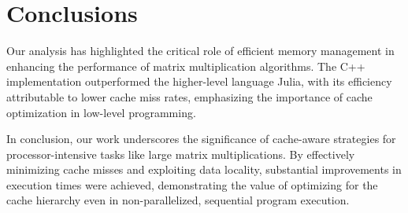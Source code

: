 \documentclass[11pt,a4paper]{article}
\begin{document}
\section{Conclusions}
Our analysis has highlighted the critical role of efficient memory management in enhancing the performance 
of matrix multiplication algorithms. The C++ implementation outperformed the higher-level language Julia, 
with its efficiency attributable to lower cache miss rates, emphasizing the importance of cache optimization 
in low-level programming.

In conclusion, our work underscores the significance of cache-aware strategies for processor-intensive tasks 
like large matrix multiplications. By effectively minimizing cache misses and exploiting data locality, 
substantial improvements in execution times were achieved, demonstrating the value of optimizing for the cache 
hierarchy even in non-parallelized, sequential program execution.
\end{document}
